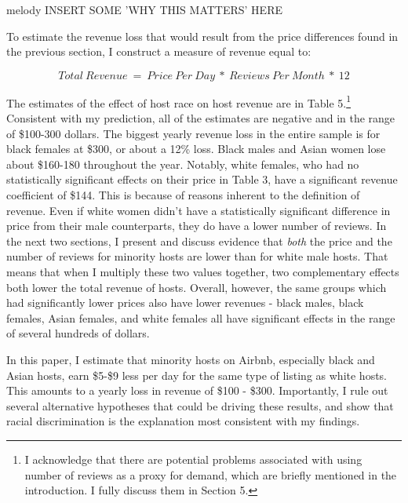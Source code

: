 
melody INSERT SOME 'WHY THIS MATTERS' HERE

To estimate the revenue loss that would result from the price differences found in the previous section, I construct a measure of revenue equal to: 

\[Total \: Revenue \ = \ Price \: Per \: Day \ * \ Reviews \: Per \: Month \ * \ 12\] 

The estimates of the effect of host race on host revenue are in Table 5.\footnote{I acknowledge that there are potential problems associated with using number of reviews as a proxy for demand, which are briefly mentioned in the introduction. I fully discuss them in Section 5.} Consistent with my prediction, all of the estimates are negative and in the range of \$100-300 dollars. The biggest yearly revenue loss in the entire sample is for black females at \$300, or about a 12\% loss. Black males and Asian women lose about \$160-180 throughout the year. Notably, white females, who had no statistically significant effects on their price in Table 3, have a significant revenue coefficient of \$144. This is because of reasons inherent to the definition of revenue. Even if white women didn't have a statistically significant difference in price from their male counterparts, they do have a lower number of reviews. In the next two sections, I present and discuss evidence that \textit{both} the price and the number of reviews for minority hosts are lower than for white male hosts. That means that when I multiply these two values together, two complementary effects both lower the total revenue of hosts. Overall, however, the same groups which had significantly lower prices also have lower revenues - black males, black females, Asian females, and white females all have significant effects in the range of several hundreds of dollars. 


In this paper, I estimate that minority hosts on Airbnb, especially black and Asian hosts, earn \$5-\$9 less per day for the same type of listing as white hosts. This amounts to a yearly loss in revenue of \$100 - \$300. Importantly, I rule out several alternative hypotheses that could be driving these results, and show that racial discrimination is the explanation most consistent with my findings. 

